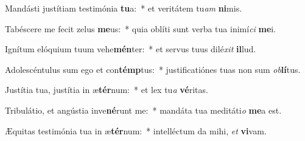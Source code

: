 \item Mandásti justítiam testimónia \textbf{tu}a:~* et veritátem tu\textit{am} \textbf{ni}mis.
\item Tabéscere me fecit zelus \textbf{me}us:~* quia oblíti sunt verba tua inimí\textit{ci} \textbf{me}i.
\item Ignítum elóquium tuum vehe\textbf{mén}ter:~* et servus tuus dilé\textit{xit} \textbf{il}lud.
\item Adolescéntulus sum ego et con\textbf{témp}tus:~* justificatiónes tuas non sum \textit{ob}\textbf{lí}tus.
\item Justítia tua, justítia in æ\textbf{tér}num:~* et lex tu\textit{a} \textbf{vé}ritas.
\item Tribulátio, et angústia inve\textbf{né}runt me:~* mandáta tua meditáti\textit{o} \textbf{me}a est.
\item Æquitas testimónia tua in æ\textbf{tér}num:~* intelléctum da mihi, \textit{et} \textbf{vi}vam.
